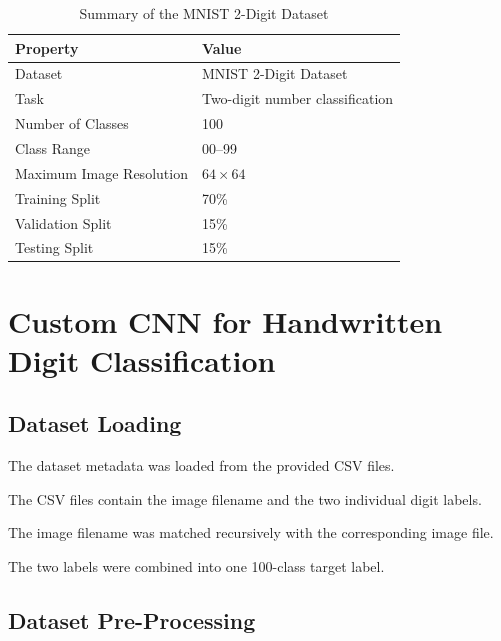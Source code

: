 \documentclass[12pt,a4paper]{report}
\begin{document}
\begin{table}[H]
\centering
\caption{Summary of the MNIST 2-Digit Dataset}
\label{tab:dataset-summary}

\begin{tabular}{ll}
\toprule
\textbf{Property} & \textbf{Value} \\
\midrule
Dataset & MNIST 2-Digit Dataset \\
Task & Two-digit number classification \\
Number of Classes & 100 \\
Class Range & 00--99 \\
Maximum Image Resolution & $64\times64$ \\
Training Split & 70\% \\
Validation Split & 15\% \\
Testing Split & 15\% \\
\bottomrule
\end{tabular}

\end{table}



\chapter{Custom CNN for Handwritten Digit Classification}

\section{Dataset Loading}

The dataset metadata was loaded from the provided CSV files.

The CSV files contain the image filename and the two individual
digit labels.

The image filename was matched recursively with the corresponding
image file.

The two labels were combined into one 100-class target label.

\section{Dataset Pre-Processing}
\end{document}
